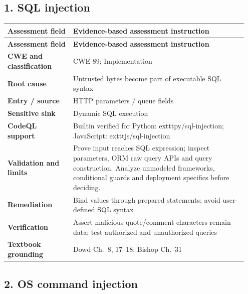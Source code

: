 \documentclass[11pt,letterpaper,oneside]{book}
\begin{document}
\subsection{1. SQL injection}

\small
\setlength{\tabcolsep}{2pt}
\renewcommand{\arraystretch}{1.18}
\begin{longtable}{>{\raggedright\arraybackslash}p{0.26\linewidth}>{\raggedright\arraybackslash}p{0.69\linewidth}}
\toprule
\textbf{Assessment field} & \textbf{Evidence-based assessment instruction}\\
\midrule
\endfirsthead
\toprule
\textbf{Assessment field} & \textbf{Evidence-based assessment instruction}\\
\midrule
\endhead
\textbf{CWE and classification} & CWE-89; Implementation\\
\textbf{Root cause} & Untrusted bytes become part of executable SQL syntax\\
\textbf{Entry / source} & HTTP parameters / queue fields\\
\textbf{Sensitive sink} & Dynamic SQL execution\\
\textbf{CodeQL support} & Builtin verified for Python: 	exttt{py/sql-injection}; JavaScript: 	exttt{js/sql-injection}\\
\textbf{Validation and limits} & Prove input reaches SQL expression; inspect parameters, ORM raw query APIs and query construction. Analyze unmodeled frameworks, conditional guards and deployment specifics before deciding.\\
\textbf{Remediation} & Bind values through prepared statements; avoid user-defined SQL syntax\\
\textbf{Verification} & Assert malicious quote/comment characters remain data; test authorized and unauthorized queries\\
\textbf{Textbook grounding} & Dowd Ch.~8, 17--18; Bishop Ch.~31\\
\bottomrule
\end{longtable}
\normalsize

\subsection{2. OS command injection}
\end{document}
